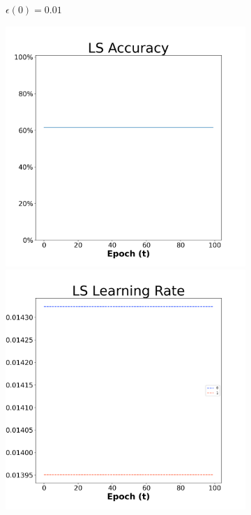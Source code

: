 \begin{figure}[H]
\begin{subfigure}{0.3\textwidth}
  \caption{$\epsilon(0)=0.01$}
\end{subfigure}\hfil %
\begin{subfigure}{0.3\textwidth}
  \includegraphics[width=\linewidth]{images/exper1/SP/LS_0.03_acc.png}
  \includegraphics[width=\linewidth]{images/exper1/SP/LS_0.03_lr.png}

\end{subfigure}
\end{figure}
